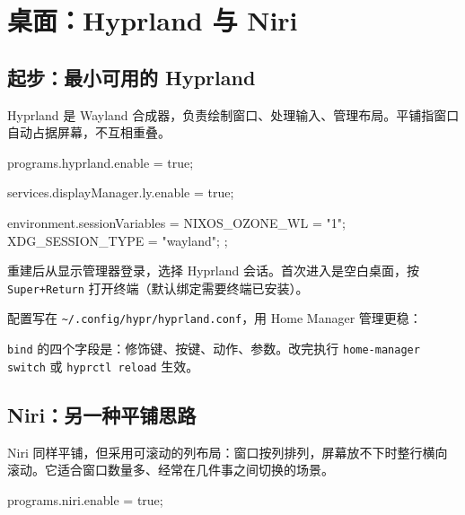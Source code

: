 \chapter{桌面：Hyprland 与 Niri}

\section{起步：最小可用的 Hyprland}

Hyprland 是 Wayland 合成器，负责绘制窗口、处理输入、管理布局。平铺指窗口自动占据屏幕，不互相重叠。

\begin{nixcode}
programs.hyprland.enable = true;

services.displayManager.ly.enable = true;

environment.sessionVariables = {
  NIXOS_OZONE_WL = "1";
  XDG_SESSION_TYPE = "wayland";
};
\end{nixcode}

重建后从显示管理器登录，选择 Hyprland 会话。首次进入是空白桌面，按 \texttt{Super+Return} 打开终端（默认绑定需要终端已安装）。

配置写在 \texttt{\textasciitilde/.config/\allowbreak{}hypr/\allowbreak{}hyprland.conf}，用 Home Manager 管理更稳：


\texttt{bind} 的四个字段是：修饰键、按键、动作、参数。改完执行 \texttt{home-manager switch} 或 \texttt{hyprctl reload} 生效。

\section{Niri：另一种平铺思路}

Niri 同样平铺，但采用可滚动的列布局：窗口按列排列，屏幕放不下时整行横向滚动。它适合窗口数量多、经常在几件事之间切换的场景。

\begin{nixcode}
programs.niri.enable = true;
\end{nixcode}

